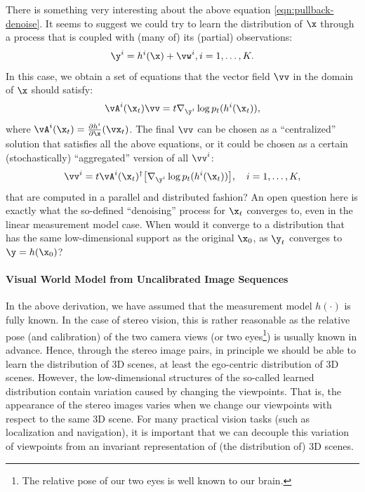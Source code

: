 \documentclass[../../book-main.tex]{subfiles}
\begin{document}
\begin{remark}
{There is something very interesting about the above equation \eqref{eqn:pullback-denoise}. It seems to suggest we could try to learn the distribution of $\x$ through a process that is coupled with (many of) its (partial) observations:
\begin{equation}
\y^i = h^i(\x) +\vw^i, i =1, \ldots, K.
\end{equation} In this case, we obtain a set of equations that the vector field $\vv$ in the domain of $\x$ should satisfy:
\begin{equation}
    \vA^i(\x_t) \vv = t \nabla_{\y^i} \log p_t(h^i(\x_t)),
\label{eqn:federated-pushforward}
\end{equation}
where $\vA^i(\x_t) = \frac{\partial h^i}{\partial \x}(\vx_t)$. The final $\vv$ can be chosen as a ``centralized'' solution that satisfies all the above equations, or it could be chosen as a certain (stochastically) ``aggregated'' version of all $\vv^i$:
\begin{equation}
    \vv^i = t\vA^i(\x_t)^\dagger \big[\nabla_{\y^i} \log p_t(h^i(\x_t))\big], \quad i = 1, \ldots, K,
\end{equation}
that are computed in a parallel and distributed fashion? An open question here is exactly what the so-defined ``denoising'' process for $\x_t$ converges to, even in the linear measurement model case. When would it converge to a distribution that has the same low-dimensional support as the original $\x_0$, as $\y_t$ converges to $\y = h(\x_0)$? }
\end{remark}



\paragraph{Visual World Model from Uncalibrated Image Sequences}

In the above derivation, we have assumed that the measurement model $h(\cdot)$ is fully known. In the case of stereo vision, this is rather reasonable as the relative pose (and calibration) of the two camera views (or two eyes\footnote{The relative pose of our two eyes is well known to our brain.}) is usually known in advance. Hence, through the stereo image pairs, in principle we should be able to learn the distribution of 3D scenes, at least the ego-centric distribution of 3D scenes. However, the low-dimensional structures of the so-called learned distribution contain variation caused by changing the viewpoints. That is, the appearance of the stereo images varies when we change our viewpoints with respect to the same 3D scene. For many practical vision tasks (such as localization and navigation), it is important that we can decouple this variation of viewpoints from an invariant representation of (the distribution of) 3D scenes.
\end{document}
